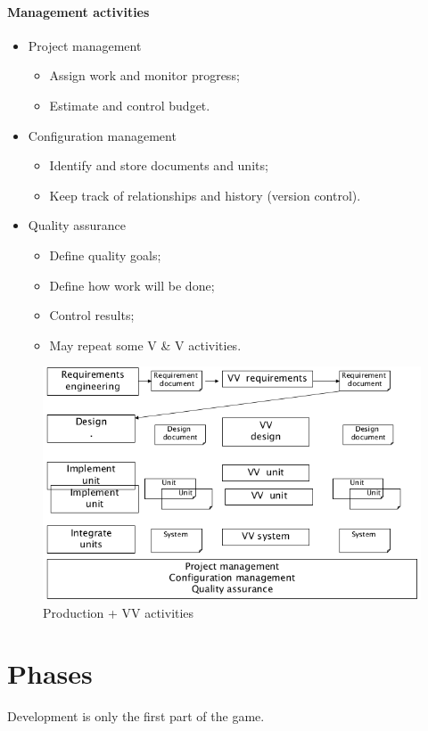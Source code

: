 \paragraph{Management activities}
\begin{itemize}
\item Project management
\begin{itemize}
\item Assign work and monitor progress;
\item Estimate and control budget.
\end{itemize}
\item Configuration management
\begin{itemize}
\item Identify and store documents and units;
\item Keep track of relationships and history (version control).
\end{itemize}
\item Quality assurance
\begin{itemize}
\item Define quality goals;
\item Define how work will be done;
\item Control results;
\item May repeat some V \& V activities.
\end{itemize}
\end{itemize}

\begin{figure}[hbtp]
\centering
\includegraphics[scale=0.5]{images/software_activities.png}
\caption{Production + VV activities}
\end{figure}

\section{Phases}
Development is only the first part of the game. 

